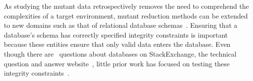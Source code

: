 




As studying the mutant data retrospectively removes the need to comprehend the complexities of a target environment,
mutant reduction methods can be extended to new domains such as that of relational database
schemas~\cite{mcminn2016virtual, mcminn2015effectiveness, wright2013efficient}. Ensuring that a database's schema has
correctly specified integrity constraints is important because these entities ensure that only valid data enters the
database. Even though there are \numquestions~questions about databases on StackExchange, the technical question and
answer website~\cite{stackexchange}, little prior work has focused on testing these integrity
constraints~\cite{mcminn2016virtual}.



